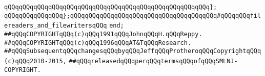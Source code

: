 \verb|qQQqqQQqqQQqqQQqqQQqqQQqqQQqqQQqqQQqqQQqqQQqqQQqqQQqqQQq};|\newline
\newline
\verb|qQQqqQQqqQQqqQQq};qQQqqQQqqQQqqQQqqQQqqQQqqQQqqQQqqQQqqQQq#qQQqqQQqfilereaders_and_filewritersqQQq|\newline
\verb|end;|\newline
\newline
\newline
\verb|##qQQqCOPYRIGHTqQQq(c)qQQq1991qQQqJohnqQQqH.qQQqReppy.|\newline
\verb|##qQQqCOPYRIGHTqQQq(c)qQQq1996qQQqAT&TqQQqResearch.|\newline
\verb|##qQQqSubsequentqQQqchangesqQQqbyqQQqJeffqQQqProtheroqQQqCopyrightqQQq(c)qQQq2010-2015,|\newline
\verb|##qQQqreleasedqQQqperqQQqtermsqQQqofqQQqSMLNJ-COPYRIGHT.|\newline

